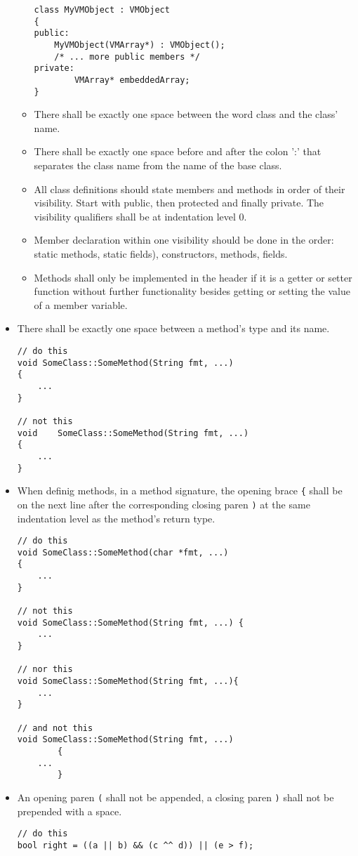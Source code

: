 \documentclass{scrartcl}
\begin{document}
\begin{itemize}
\begin{itemize}
\begin{lstlisting}
class MyVMObject : VMObject
{
public:
    MyVMObject(VMArray*) : VMObject();
    /* ... more public members */
private:
		VMArray* embeddedArray;
}
\end{lstlisting}
\item There shall be exactly one space between the word class and
 the class' name.
\item There shall be exactly one space before and after the colon
 ':' that separates the class name from the name of the base class.
\item All class definitions should state members and methods in order
 of their visibility. Start with public, then protected and finally
 private. The visibility qualifiers shall be at indentation level 0.
\item Member declaration within one visibility should be done in the
 order: static methods, static fields), constructors, methods, fields.
\item Methods shall only be implemented in the header if it is a
 getter or setter function without further functionality besides
 getting or setting the value of a member variable.
\end{itemize}
\item There shall be exactly one space between a method's type and
  its name.
\begin{lstlisting}
// do this
void SomeClass::SomeMethod(String fmt, ...)
{
    ...
}

// not this
void    SomeClass::SomeMethod(String fmt, ...)
{
    ...
}
\end{lstlisting}
\item When definig methods, in a method signature, the opening
  brace \lstinline|{| shall be on the  next line after the corresponding
  closing paren \lstinline|)| at the same indentation level as the 
  method's return type.
\begin{lstlisting}
// do this
void SomeClass::SomeMethod(char *fmt, ...) 
{
    ...
}

// not this
void SomeClass::SomeMethod(String fmt, ...) {
    ...
}

// nor this
void SomeClass::SomeMethod(String fmt, ...){
    ...
}

// and not this
void SomeClass::SomeMethod(String fmt, ...)
        {
    ...
        }
\end{lstlisting}
\item An opening paren \lstinline|(| shall not be appended, a closing
  paren \lstinline|)| shall not be prepended with a space.
\begin{lstlisting}
// do this
bool right = ((a || b) && (c ^^ d)) || (e > f);


\end{lstlisting}
\end{itemize}
\end{document}
